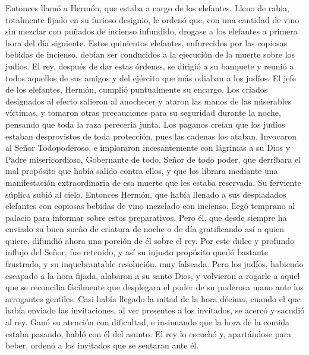 Entonces llamó a Hermón, que estaba a cargo de los
elefantes. Lleno de rabia, totalmente fijado en su furioso designio,
 le ordenó que, con una cantidad de vino sin mezclar con
puñados de incienso infundido, drogase a los elefantes a primera hora
del día siguiente. Estos quinientos elefantes, enfurecidos por las
copiosas bebidas de incienso, debían ser conducidos a la ejecución de la
muerte sobre los judíos.  El rey, después de dar estas
órdenes, se dirigió a su banquete y reunió a todos aquellos de sus
amigos y del ejército que más odiaban a los judíos.  El
jefe de los elefantes, Hermón, cumplió puntualmente su encargo.
 Los criados designados al efecto salieron al anochecer y
ataron las manos de las miserables víctimas, y tomaron otras
precauciones para su seguridad durante la noche, pensando que toda la
raza perecería junta.  Los paganos creían que los judíos
estaban desprovistos de toda protección, pues las cadenas los ataban.
 Invocaron al Señor Todopoderoso, e imploraron
incesantemente con lágrimas a su Dios y Padre misericordioso, Gobernante
de todo, Señor de todo poder,  que derribara el mal
propósito que había salido contra ellos, y que los librara mediante una
manifestación extraordinaria de esa muerte que les estaba reservada.
 Su ferviente súplica subió al cielo. 
Entonces Hermón, que había llenado a sus despiadados elefantes con
copiosas bebidas de vino mezclado con incienso, llegó temprano al
palacio para informar sobre estos preparativos.  Pero él,
que desde siempre ha enviado su buen sueño de criatura de noche o de día
gratificando así a quien quiere, difundió ahora una porción de él sobre
el rey.  Por este dulce y profundo influjo del Señor, fue
retenido, y así su injusto propósito quedó bastante frustrado, y su
inquebrantable resolución, muy falseada.  Pero los
judíos, habiendo escapado a la hora fijada, alabaron a su santo Dios, y
volvieron a rogarle a aquel que se reconcilia fácilmente que desplegara
el poder de su poderosa mano ante los arrogantes gentiles.
 Casi había llegado la mitad de la hora décima, cuando el
que había enviado las invitaciones, al ver presentes a los invitados, se
acercó y sacudió al rey.  Ganó su atención con
dificultad, e insinuando que la hora de la comida estaba pasando, habló
con él del asunto.  El rey lo escuchó y, apartándose para
beber, ordenó a los invitados que se sentaran ante él. 
